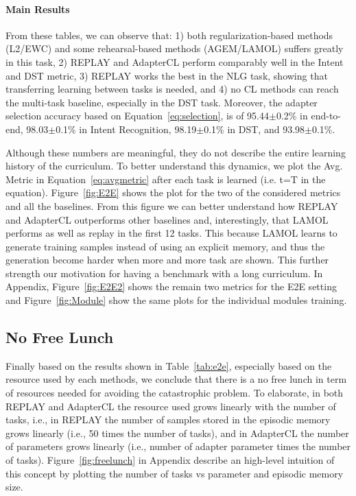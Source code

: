 \documentclass[11pt,a4paper]{article}
\begin{document}
\paragraph{Main Results} From these tables, we can observe that: 1) both regularization-based methods (L2/EWC) and some rehearsal-based methods (AGEM/LAMOL) suffers greatly in this task, 2) REPLAY and AdapterCL perform comparably well in the Intent and DST metric, 3) REPLAY works the best in the NLG task, showing that transferring learning between tasks is needed, and 4) no CL methods can reach the multi-task baseline, especially in the DST task. Moreover, the adapter selection accuracy based on Equation~\ref{eq:selection}, is of 95.44$\pm$0.2\% in end-to-end, 98.03$\pm$0.1\% in Intent Recognition, 98.19$\pm$0.1\% in DST, and 93.98$\pm$0.1\%.

Although these numbers are meaningful, they do not describe the entire learning history of the curriculum. To better understand this dynamics, we plot the Avg. Metric in Equation~\ref{eq:avgmetric} after each task is learned (i.e. t=T in the equation). Figure~\ref{fig:E2E} shows the plot for the two of the considered metrics and all the baselines. From this figure we can better understand how REPLAY and AdapterCL outperforms other baselines and, interestingly, that LAMOL performs as well as replay in the first 12 tasks. This because LAMOL learns to generate training samples instead of using an explicit memory, and thus the generation become harder when more and more task are shown. This further strength our motivation for having a benchmark with a long curriculum. In Appendix, Figure~\ref{fig:E2E2} shows the remain two metrics for the E2E setting and Figure~\ref{fig:Module} show the same plots for the individual modules training. 

\subsection{No Free Lunch} Finally based on the results shown in Table~\ref{tab:e2e}, especially based on the resource used by each methods, we conclude that there is a no free lunch in term of resources needed for avoiding the catastrophic problem. To elaborate, in both REPLAY and AdapterCL the resource used grows linearly with the number of tasks, i.e., in REPLAY the number of samples stored in the episodic memory grows linearly (i.e., 50 times the number of tasks), and in AdapterCL the number of parameters grows linearly (i.e., number of adapter parameter times the number of tasks). Figure~\ref{fig:freelunch} in Appendix describe an high-level intuition of this concept by plotting the number of tasks vs parameter and episodic memory size.
\end{document}
